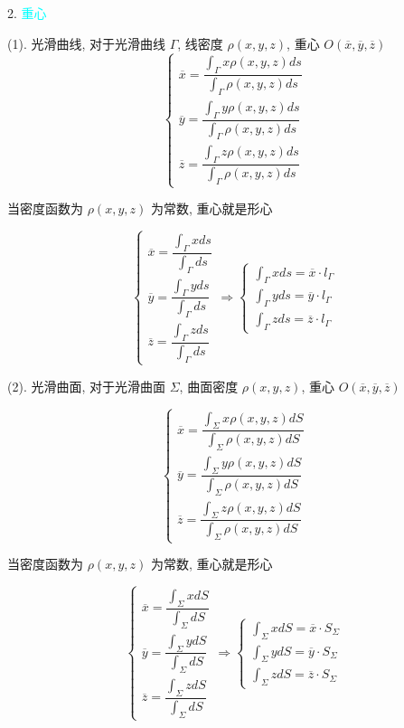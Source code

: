 2. \textcolor{cyan}{重心}
\begin{theorem}[重心公式]

	(1). 光滑曲线, 对于光滑曲线 $\Gamma$, 线密度 $\rho(x,y,z)$, 重心 $O(\overline{x}, \overline{y}, \overline{z})$
	$$\begin{cases}
		\overline{x} = \dfrac{\int_{\Gamma}x\rho(x,y,z)ds}{\int_{\Gamma}\rho(x,y,z)ds} \\
		\overline{y} = \dfrac{\int_{\Gamma}y\rho(x,y,z)ds}{\int_{\Gamma}\rho(x,y,z)ds} \\
		\overline{z} = \dfrac{\int_{\Gamma}z\rho(x,y,z)ds}{\int_{\Gamma}\rho(x,y,z)ds}
	\end{cases}$$
	
	当密度函数为 $\rho(x,y,z)$ 为常数, 重心就是形心

	$$\begin{cases}
		\overline{x} = \dfrac{\int_{\Gamma}xds}{\int_{\Gamma}ds} \\
		\overline{y} = \dfrac{\int_{\Gamma}yds}{\int_{\Gamma}ds} \\
		\overline{z} = \dfrac{\int_{\Gamma}zds}{\int_{\Gamma}ds}
	\end{cases}\Rightarrow 
	\begin{cases}
		\int_{\Gamma}xds = \overline{x}\cdot l_{\Gamma}\\
		\int_{\Gamma}yds = \overline{y}\cdot l_{\Gamma}\\
		\int_{\Gamma}zds = \overline{z}\cdot l_{\Gamma}
	\end{cases}$$

	(2). 光滑曲面, 对于光滑曲面 $\Sigma$, 曲面密度 $\rho(x,y,z)$, 重心 $O(\overline{x}, \overline{y}, \overline{z})$

	$$\begin{cases}
		\overline{x} = \dfrac{\int_{\Sigma}x\rho(x,y,z)dS}{\int_{\Sigma}\rho(x,y,z)dS} \\
		\overline{y} = \dfrac{\int_{\Sigma}y\rho(x,y,z)dS}{\int_{\Sigma}\rho(x,y,z)dS} \\
		\overline{z} = \dfrac{\int_{\Sigma}z\rho(x,y,z)dS}{\int_{\Sigma}\rho(x,y,z)dS}
	\end{cases}$$
	
	当密度函数为 $\rho(x,y,z)$ 为常数, 重心就是形心

	$$\begin{cases}
		\overline{x} = \dfrac{\int_{\Sigma}xdS}{\int_{\Sigma}dS} \\
		\overline{y} = \dfrac{\int_{\Sigma}ydS}{\int_{\Sigma}dS} \\
		\overline{z} = \dfrac{\int_{\Sigma}zdS}{\int_{\Sigma}dS}
	\end{cases}\Rightarrow 
	\begin{cases}
		\int_{\Sigma}xdS = \overline{x}\cdot S_{\Sigma}\\
		\int_{\Sigma}ydS = \overline{y}\cdot S_{\Sigma}\\
		\int_{\Sigma}zdS = \overline{z}\cdot S_{\Sigma}
	\end{cases}$$
\end{theorem}

